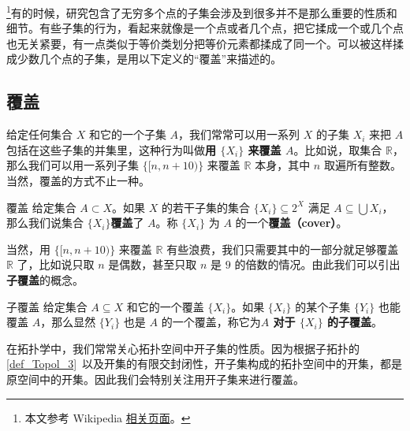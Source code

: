 


\begin{issues}
\issueDraft
\end{issues}

\footnote{本文参考 Wikipedia \href{https://en.wikipedia.org/wiki/Sequentially_compact_space}{相关页面}。}有的时候，研究包含了无穷多个点的子集会涉及到很多并不是那么重要的性质和细节。有些子集的行为，看起来就像是一个点或者几个点，把它揉成一个或几个点也无关紧要，有一点类似于等价类划分把等价元素都揉成了同一个。可以被这样揉成少数几个点的子集，是用以下定义的“覆盖”来描述的。


\subsection{覆盖}

给定任何集合 $X$ 和它的一个子集 $A$，我们常常可以用一系列 $X$ 的子集 $X_i$ 来把 $A$ 包括在这些子集的并集里，这种行为叫做\textbf{用 $\{X_i\}$ 来覆盖 $A$}。比如说，取集合 $\mathbb{R}$，那么我们可以用一系列子集 $\{[n, n+10)\}$ 来覆盖 $\mathbb{R}$ 本身，其中 $n$ 取遍所有整数。当然，覆盖的方式不止一种。

\begin{definition}{覆盖}
给定集合 $A\subset X$。如果 $X$ 的若干子集的集合 $\{X_i\}\subseteq 2^X$ 满足 $A\subseteq\bigcup X_i$，那么我们说集合 $\{X_i\}$\textbf{覆盖}了 $A$。称 $\{X_i\}$ 为 $A$ 的一个\textbf{覆盖（cover）}。
\end{definition}

当然，用 $\{[n, n+10)\}$ 来覆盖 $\mathbb{R}$ 有些浪费，我们只需要其中的一部分就足够覆盖 $\mathbb{R}$ 了，比如说只取 $n$ 是偶数，甚至只取 $n$ 是 $9$ 的倍数的情况。由此我们可以引出\textbf{子覆盖}的概念。

\begin{definition}{子覆盖}
给定集合 $A\subseteq X$ 和它的一个覆盖 $\{X_i\}$。如果 $\{X_i\}$ 的某个子集 $\{Y_i\}$ 也能覆盖 $A$，那么显然 $\{Y_i\}$ 也是 $A$ 的一个覆盖，称它为\textbf{$A$ 对于 $\{X_i\}$ 的子覆盖}。
\end{definition}

在拓扑学中，我们常常关心拓扑空间中开子集的性质。因为根据子拓扑的\autoref{def_Topol_3}~以及开集的有限交封闭性，开子集构成的拓扑空间中的开集，都是原空间中的开集。因此我们会特别关注用开子集来进行覆盖。

